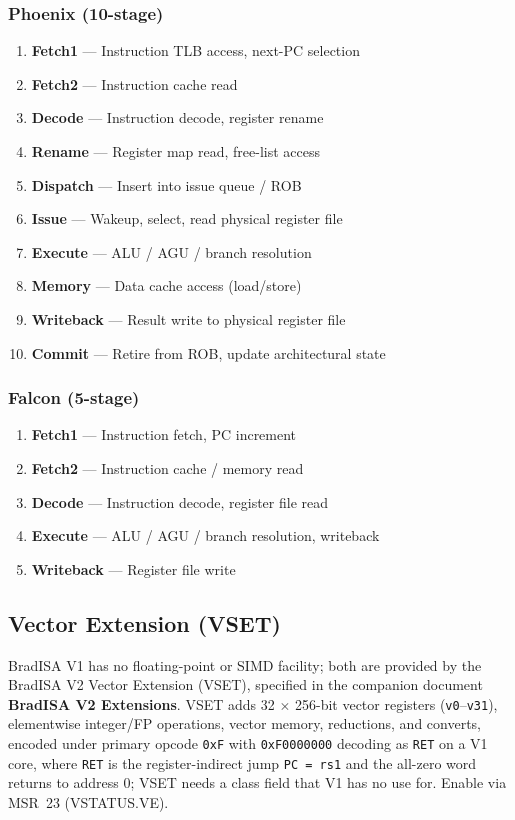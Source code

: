 \documentclass[11pt,a4paper]{article}
\begin{document}
\subsubsection*{Phoenix (10-stage)}
\begin{enumerate}[nosep]
  \item \textbf{Fetch1} --- Instruction TLB access, next-PC selection
  \item \textbf{Fetch2} --- Instruction cache read
  \item \textbf{Decode} --- Instruction decode, register rename
  \item \textbf{Rename} --- Register map read, free-list access
  \item \textbf{Dispatch} --- Insert into issue queue / ROB
  \item \textbf{Issue} --- Wakeup, select, read physical register file
  \item \textbf{Execute} --- ALU / AGU / branch resolution
  \item \textbf{Memory} --- Data cache access (load/store)
  \item \textbf{Writeback} --- Result write to physical register file
  \item \textbf{Commit} --- Retire from ROB, update architectural state
\end{enumerate}

\subsubsection*{Falcon (5-stage)}
\begin{enumerate}[nosep]
  \item \textbf{Fetch1} --- Instruction fetch, PC increment
  \item \textbf{Fetch2} --- Instruction cache / memory read
  \item \textbf{Decode} --- Instruction decode, register file read
  \item \textbf{Execute} --- ALU / AGU / branch resolution, writeback
  \item \textbf{Writeback} --- Register file write
\end{enumerate}

\subsection{Vector Extension (VSET)}

BradISA V1 has no floating-point or SIMD facility; both are provided by the
BradISA V2 Vector Extension (VSET), specified in the companion document
\textbf{BradISA V2 Extensions}. VSET adds 32 $\times$ 256-bit vector
registers ({\tt v0}--{\tt v31}), elementwise integer/FP operations, vector
memory, reductions, and converts, encoded under primary opcode {\tt 0xF}
with {\tt 0xF0000000} decoding as {\tt RET} on a V1 core, where {\tt RET} is
the register-indirect jump {\tt PC = rs1} and the all-zero word returns to
address 0; VSET needs a class field that V1 has no use for.
Enable via MSR~23 (VSTATUS.VE).
\end{document}
